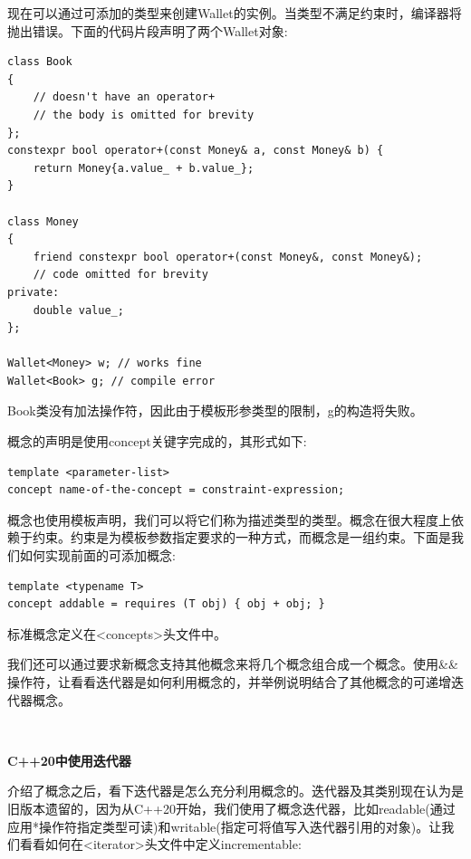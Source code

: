 现在可以通过可添加的类型来创建Wallet的实例。当类型不满足约束时，编译器将抛出错误。下面的代码片段声明了两个Wallet对象: \par

\begin{lstlisting}[caption={}]
class Book
{
	// doesn't have an operator+
	// the body is omitted for brevity
};
constexpr bool operator+(const Money& a, const Money& b) {
	return Money{a.value_ + b.value_};
}

class Money
{
	friend constexpr bool operator+(const Money&, const Money&);
	// code omitted for brevity
private:
	double value_;
}; 

Wallet<Money> w; // works fine
Wallet<Book> g; // compile error
\end{lstlisting}

Book类没有加法操作符，因此由于模板形参类型的限制，g的构造将失败。 \par
概念的声明是使用concept关键字完成的，其形式如下: \par

\begin{lstlisting}[caption={}]
template <parameter-list>
concept name-of-the-concept = constraint-expression;
\end{lstlisting}

概念也使用模板声明，我们可以将它们称为描述类型的类型。概念在很大程度上依赖于约束。约束是为模板参数指定要求的一种方式，而概念是一组约束。下面是我们如何实现前面的可添加概念: \par

\begin{lstlisting}[caption={}]
template <typename T>
concept addable = requires (T obj) { obj + obj; }
\end{lstlisting}

标准概念定义在<concepts>头文件中。 \par
我们还可以通过要求新概念支持其他概念来将几个概念组合成一个概念。使用\&\&操作符，让看看迭代器是如何利用概念的，并举例说明结合了其他概念的可递增迭代器概念。 \par

\noindent\textbf{}\ \par
\textbf{C++20中使用迭代器} \ \par
介绍了概念之后，看下迭代器是怎么充分利用概念的。迭代器及其类别现在认为是旧版本遗留的，因为从C++20开始，我们使用了概念迭代器，比如readable(通过应用*操作符指定类型可读)和writable(指定可将值写入迭代器引用的对象)。让我们看看如何在<iterator>头文件中定义incrementable: \par

